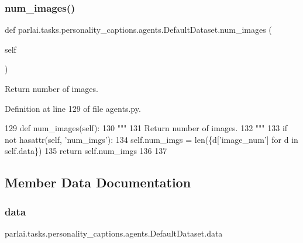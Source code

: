 \subsubsection{\texorpdfstring{num\+\_\+images()}{num\_images()}}
{\footnotesize\ttfamily def parlai.\+tasks.\+personality\+\_\+captions.\+agents.\+Default\+Dataset.\+num\+\_\+images (\begin{DoxyParamCaption}\item[{}]{self }\end{DoxyParamCaption})}

\begin{DoxyVerb}Return number of images.
\end{DoxyVerb}
 

Definition at line 129 of file agents.\+py.


\begin{DoxyCode}
129     \textcolor{keyword}{def }num\_images(self):
130         \textcolor{stringliteral}{"""}
131 \textcolor{stringliteral}{        Return number of images.}
132 \textcolor{stringliteral}{        """}
133         \textcolor{keywordflow}{if} \textcolor{keywordflow}{not} hasattr(self, \textcolor{stringliteral}{'num\_imgs'}):
134             self.num\_imgs = len(\{d[\textcolor{stringliteral}{'image\_num'}] \textcolor{keywordflow}{for} d \textcolor{keywordflow}{in} self.data\})
135         \textcolor{keywordflow}{return} self.num\_imgs
136 
137 
\end{DoxyCode}


\subsection{Member Data Documentation}
\mbox{\label{classparlai_1_1tasks_1_1personality__captions_1_1agents_1_1DefaultDataset_a52ccf1dae943d045a66a7bcc66804638}} 
\subsubsection{\texorpdfstring{data}{data}}
{\footnotesize\ttfamily parlai.\+tasks.\+personality\+\_\+captions.\+agents.\+Default\+Dataset.\+data}



